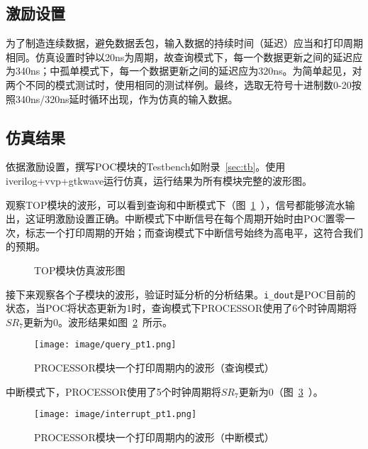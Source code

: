 \documentclass[lang=cn,a4paper,newtx]{elegantpaper}
\begin{document}
\subsection{激励设置}
为了制造连续数据，避免数据丢包，输入数据的持续时间（延迟）应当和打印周期相同。仿真设置时钟以20ns为周期，故查询模式下，每一个数据更新之间的延迟应为340ns；中孤单模式下，每一个数据更新之间的延迟应为320ns。为简单起见，对两个不同的模式测试时，使用相同的测试样例。最终，选取无符号十进制数0-20按照340ns/320ns延时循环出现，作为仿真的输入数据。
\subsection{仿真结果}
依据激励设置，撰写POC模块的Testbench如附录~\ref{sec:tb}。使用iverilog+vvp+gtkwave运行仿真，运行结果为所有模块完整的波形图。

观察TOP模块的波形，可以看到查询和中断模式下（图~\ref{sim:top}~），信号都能够流水输出，这证明激励设置正确。中断模式下中断信号在每个周期开始时由POC置零一次，标志一个打印周期的开始；而查询模式下中断信号始终为高电平，这符合我们的预期。
\begin{figure}[htbp]
    \centering
    \newline
    \centering
    \caption{TOP模块仿真波形图}
    \label{sim:top}
\end{figure}

接下来观察各个子模块的波形，验证时延分析的分析结果。\texttt{i\_dout}是POC目前的状态，当POC将状态更新为1时，查询模式下PROCESSOR使用了6个时钟周期将$SR_7$更新为0。波形结果如图~\ref{fig:sim:processor}~所示。

\begin{figure}[htbp]
    \centering
    \texttt{[image: image/query\_pt1.png]}
    \caption{PROCESSOR模块一个打印周期内的波形（查询模式）}
    \label{fig:sim:processor}
\end{figure}
\newpage
中断模式下，PROCESSOR使用了5个时钟周期将$SR_7$更新为0（图~\ref{fig:sim:processor_int}~）。
\begin{figure}[htbp]
    \centering
    \texttt{[image: image/interrupt\_pt1.png]}
    \caption{PROCESSOR模块一个打印周期内的波形（中断模式）}
    \label{fig:sim:processor_int}
\end{figure}
\end{document}
